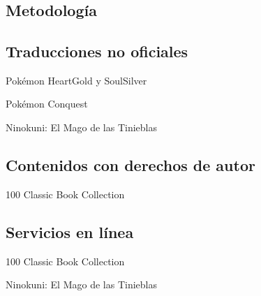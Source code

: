 
\appendix
\section{\appendixname}
\frame{\tableofcontents}

\subsection{Metodología}
\begin{frame}

\end{frame}

\subsection{Traducciones no oficiales}
\begin{frame}{Pokémon HeartGold y SoulSilver}

\end{frame}

\begin{frame}{Pokémon Conquest}

\end{frame}

\begin{frame}{Ninokuni: El Mago de las Tinieblas}

\end{frame}

\subsection{Contenidos con derechos de autor}
\begin{frame}{100 Classic Book Collection}

\end{frame}


\subsection{Servicios en línea}
\begin{frame}{100 Classic Book Collection}

\end{frame}

\begin{frame}{Ninokuni: El Mago de las Tinieblas}

\end{frame}
